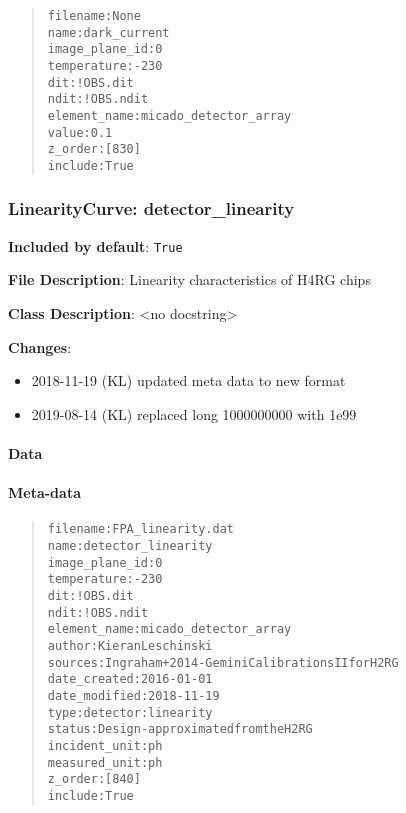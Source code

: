 \begin{quote}
\begin{alltt}
      filename : None
          name : dark_current
image_plane_id : 0
   temperature : -230
           dit : !OBS.dit
          ndit : !OBS.ndit
  element_name : micado_detector_array
         value : 0.1
       z_order : [830]
       include : True
\end{alltt}
\end{quote}


\subsubsection{LinearityCurve: \textquotedbl{}detector\_linearity\textquotedbl{}%
  \label{linearitycurve-detector-linearity}%
}

\textbf{Included by default}: \texttt{True}

\textbf{File Description}: Linearity characteristics of H4RG chips

\textbf{Class Description}: <no docstring>

\textbf{Changes}:

\begin{itemize}
\item 2018-11-19 (KL) updated meta data to new format

\item 2019-08-14 (KL) replaced long 1000000000 with 1e99
\end{itemize}


\paragraph{Data%
  \label{id9}%
}


\paragraph{Meta-data%
  \label{id10}%
}

\begin{quote}
\begin{alltt}
      filename : FPA_linearity.dat
          name : detector_linearity
image_plane_id : 0
   temperature : -230
           dit : !OBS.dit
          ndit : !OBS.ndit
  element_name : micado_detector_array
        author : Kieran Leschinski
       sources : Ingraham+ 2014 - Gemini Calibrations II for H2RG
  date_created : 2016-01-01
 date_modified : 2018-11-19
          type : detector:linearity
        status : Design - approximated from the H2RG
 incident_unit : ph
 measured_unit : ph
       z_order : [840]
       include : True
\end{alltt}
\end{quote}


